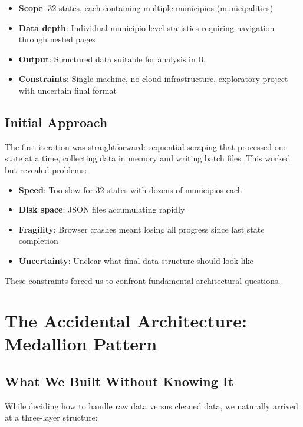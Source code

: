 \documentclass[11pt,a4paper]{article}
\begin{document}
\begin{itemize}
    \item \textbf{Scope}: 32 states, each containing multiple municipios (municipalities)
    \item \textbf{Data depth}: Individual municipio-level statistics requiring navigation through nested pages
    \item \textbf{Output}: Structured data suitable for analysis in R
    \item \textbf{Constraints}: Single machine, no cloud infrastructure, exploratory project with uncertain final format
\end{itemize}

\subsection{Initial Approach}

The first iteration was straightforward: sequential scraping that processed one state at a time, collecting data in memory and writing batch files. This worked but revealed problems:

\begin{itemize}
    \item \textbf{Speed}: Too slow for 32 states with dozens of municipios each
    \item \textbf{Disk space}: JSON files accumulating rapidly
    \item \textbf{Fragility}: Browser crashes meant losing all progress since last state completion
    \item \textbf{Uncertainty}: Unclear what final data structure should look like
\end{itemize}

These constraints forced us to confront fundamental architectural questions.

\section{The Accidental Architecture: Medallion Pattern}

\subsection{What We Built Without Knowing It}

While deciding how to handle raw data versus cleaned data, we naturally arrived at a three-layer structure:
\end{document}
